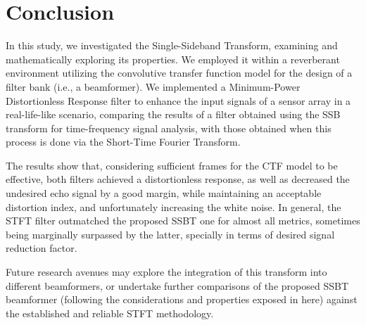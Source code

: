 \section{Conclusion}
\label{sec:conclusion}

In this study, we investigated the Single-Sideband Transform, examining and mathematically exploring its properties. We employed it within a reverberant environment utilizing the convolutive transfer function model for the design of a filter bank (i.e., a beamformer). We implemented a Minimum-Power Distortionless Response filter to enhance the input signals of a sensor array in a real-life-like scenario, comparing the results of a filter obtained using the SSB transform for time-frequency signal analysis, with those obtained when this process is done via the Short-Time Fourier Transform.

The results show that, considering sufficient frames for the CTF model to be effective, both filters achieved a distortionless response, as well as decreased the undesired echo signal by a good margin, while maintaining an acceptable distortion index, and unfortunately increasing the white noise. In general, the STFT filter outmatched the proposed SSBT one for almost all metrics, sometimes being marginally surpassed by the latter, specially in terms of desired signal reduction factor.

Future research avenues may explore the integration of this transform into different beamformers, or undertake further comparisons of the proposed SSBT beamformer (following the considerations and properties exposed in here) against the established and reliable STFT methodology.